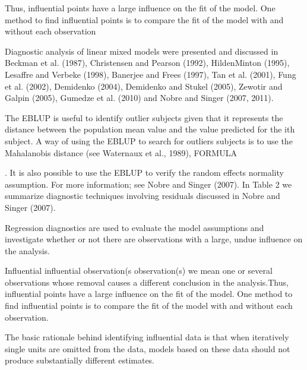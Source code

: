Thus, influential points have a large influence on the fit of the model. One method to find influential points is to compare the fit of the model with and without each observation

Diagnostic analysis of linear mixed models were
presented and discussed in Beckman et al. (1987), Christensen and Pearson (1992), HildenMinton
(1995), Lesaffre and Verbeke (1998), Banerjee and Frees (1997), Tan et al. (2001),
Fung et al. (2002), Demidenko (2004), Demidenko and Stukel (2005), Zewotir and Galpin
(2005), Gumedze et al. (2010) and Nobre and Singer (2007, 2011).




The EBLUP is useful to identify outlier subjects given that it represents the distance
between the population mean value and the value predicted for the ith subject. A way of
using the EBLUP to search for outliers subjects is to use the Mahalanobis distance (see
Waternaux et al., 1989), FORMULA

. It is also possible to use the EBLUP
to verify the random effects normality assumption. For more information; see Nobre and
Singer (2007). In Table 2 we summarize diagnostic techniques involving residuals discussed
in Nobre and Singer (2007).





Regression diagnostics are used to evaluate the model assumptions and investigate whether or not there are observations with a large, undue influence on the analysis.

Influential influential observation(s observation(s) we mean one or several observations whose
removal causes a different conclusion in the analysis.Thus, influential points have a large influence on the fit of the model. One method to find influential points is to compare the fit of the model with and without each observation.


The basic rationale behind identifying influential data is that when iteratively single units are omitted from the data, models based on these data should not produce substantially different estimates. 


